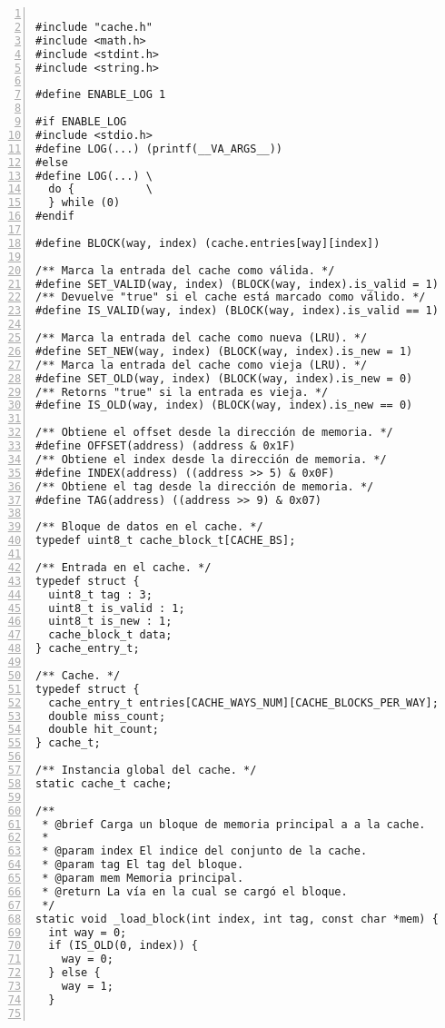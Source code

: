 \documentclass[11pt,a4paper, spanish]{article}
\begin{document}
\begin{lstlisting}[numbers=left, tabsize=2, basicstyle=\fontsize{11}{13}\ttfamily, frame=single, caption={makefile}]

#include "cache.h"
#include <math.h>
#include <stdint.h>
#include <string.h>

#define ENABLE_LOG 1

#if ENABLE_LOG
#include <stdio.h>
#define LOG(...) (printf(__VA_ARGS__))
#else
#define LOG(...) \
  do {           \
  } while (0)
#endif

#define BLOCK(way, index) (cache.entries[way][index])

/** Marca la entrada del cache como válida. */
#define SET_VALID(way, index) (BLOCK(way, index).is_valid = 1)
/** Devuelve "true" si el cache está marcado como válido. */
#define IS_VALID(way, index) (BLOCK(way, index).is_valid == 1)

/** Marca la entrada del cache como nueva (LRU). */
#define SET_NEW(way, index) (BLOCK(way, index).is_new = 1)
/** Marca la entrada del cache como vieja (LRU). */
#define SET_OLD(way, index) (BLOCK(way, index).is_new = 0)
/** Retorns "true" si la entrada es vieja. */
#define IS_OLD(way, index) (BLOCK(way, index).is_new == 0)

/** Obtiene el offset desde la dirección de memoria. */
#define OFFSET(address) (address & 0x1F)
/** Obtiene el index desde la dirección de memoria. */
#define INDEX(address) ((address >> 5) & 0x0F)
/** Obtiene el tag desde la dirección de memoria. */
#define TAG(address) ((address >> 9) & 0x07)

/** Bloque de datos en el cache. */
typedef uint8_t cache_block_t[CACHE_BS];

/** Entrada en el cache. */
typedef struct {
  uint8_t tag : 3;
  uint8_t is_valid : 1;
  uint8_t is_new : 1;
  cache_block_t data;
} cache_entry_t;

/** Cache. */
typedef struct {
  cache_entry_t entries[CACHE_WAYS_NUM][CACHE_BLOCKS_PER_WAY];
  double miss_count;
  double hit_count;
} cache_t;

/** Instancia global del cache. */
static cache_t cache;

/**
 * @brief Carga un bloque de memoria principal a a la cache.
 *
 * @param index El indice del conjunto de la cache.
 * @param tag El tag del bloque.
 * @param mem Memoria principal.
 * @return La vía en la cual se cargó el bloque.
 */
static void _load_block(int index, int tag, const char *mem) {
  int way = 0;
  if (IS_OLD(0, index)) {
    way = 0;
  } else {
    way = 1;
  }


\end{lstlisting}
\end{document}

